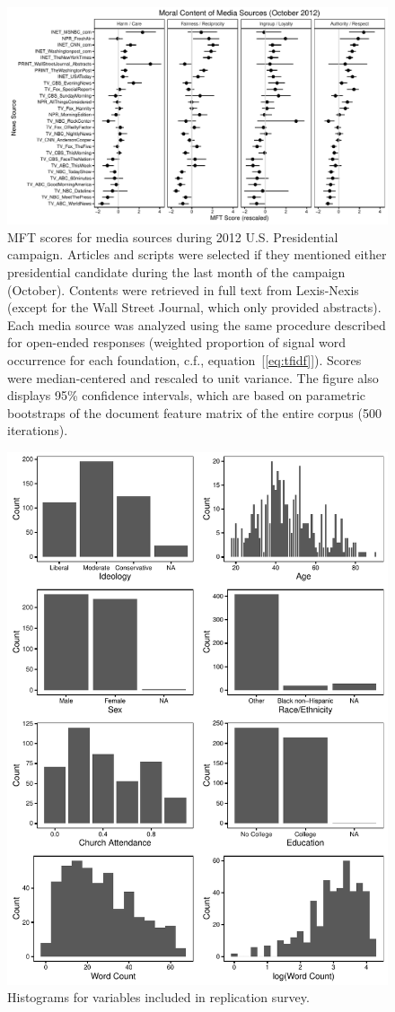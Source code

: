 \documentclass[12pt]{article}
\begin{document}
\begin{figure}[ht]\centering
\includegraphics[width=\textwidth]{../calc/fig/media_desc.pdf}
\caption{MFT scores for media sources during 2012 U.S. Presidential campaign. Articles and scripts were selected if they mentioned either presidential candidate during the last month of the campaign (October). Contents were retrieved in full text from Lexis-Nexis (except for the Wall Street Journal, which only provided abstracts). Each media source was analyzed using the same procedure described for open-ended responses (weighted proportion of signal word occurrence for each foundation, c.f., equation~[\ref{eq:tfidf}]). Scores were median-centered and rescaled to unit variance. The figure also displays 95\% confidence intervals, which are based on parametric bootstraps of the document feature matrix of the entire corpus (500 iterations).}\label{fig:media_desc}
\end{figure}

\begin{figure}[h]\centering
\includegraphics[width=.67\textwidth]{../calc/fig/app_lidesc.pdf}
\caption{Histograms for variables included in replication survey.}\label{fig:app_lidesc}
\end{figure}
\end{document}
